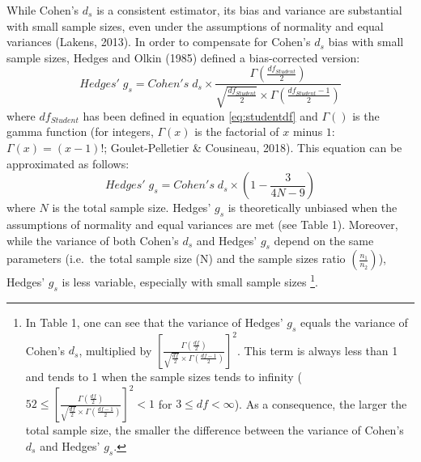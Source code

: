 \documentclass[
  english,
  man,floatsintext]{apa6}
\begin{document}
While Cohen's \(d_s\) is a consistent estimator, its bias and variance are substantial with small sample sizes, even under the assumptions of normality and equal variances (Lakens, 2013). In order to compensate for Cohen's \(d_s\) bias with small sample sizes, Hedges and Olkin (1985) defined a bias-corrected version:
\begin{equation*} 
Hedges' \; g_s = Cohen's \; d_s \times \frac{\Gamma(\frac{df_{Student}}{2})}{\sqrt{\frac{df_{Student}}{2}} \times \Gamma(\frac{df_{Student}-1}{2})}
\label{eq:Hedgesgs}
\end{equation*}
where \(df_{Student}\) has been defined in equation \ref{eq:studentdf} and \(\Gamma()\) is the gamma function (for integers, \(\Gamma(x)\) is the factorial of \(x\) minus \(1\): \(\Gamma(x)=(x-1)!\); Goulet-Pelletier \& Cousineau, 2018). This equation can be approximated as follows:
\begin{equation*} 
Hedges' \; g_s = Cohen's \; d_s \times \left( 1- \frac{3}{4N -9} \right)
\label{eq:Hedgesgsapprox}
\end{equation*}
where \(N\) is the total sample size. Hedges' \(g_s\) is theoretically unbiased when the assumptions of normality and equal variances are met (see Table 1). Moreover, while the variance of both Cohen's \(d_s\) and Hedges' \(g_s\) depend on the same parameters (i.e.~the total sample size (N) and the sample sizes ratio \(\left(\frac{n_1}{n_2}\right)\)), Hedges' \(g_s\) is less variable, especially with small sample sizes \footnote{In Table 1, one can see that the variance of Hedges' $g_s$ equals the variance of Cohen's $d_s$, multiplied by $\left[\frac{\Gamma(\frac{df}{2})}{\sqrt{\frac{df}{2}} \times \Gamma(\frac{df-1}{2})} \right] ^2$. This term is always less than 1 and tends to 1 when the sample sizes tends to infinity ($52 \le \left[\frac{\Gamma(\frac{df}{2})}{\sqrt{\frac{df}{2}} \times \Gamma(\frac{df-1}{2})} \right] ^2 < 1$ for $3 \le df < \infty$). As a consequence, the larger the total sample size, the smaller the difference between the variance of Cohen's $d_s$ and Hedges' $g_s$.}.
\end{document}

